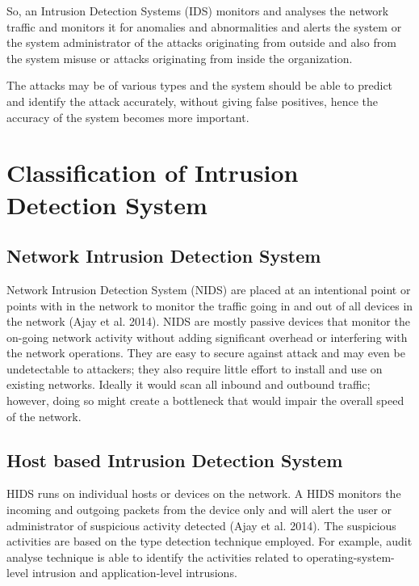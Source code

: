 \documentclass[12pt, a4paper]{report}
\begin{document}
So, an Intrusion Detection Systems (IDS) monitors and analyses the network traffic and monitors it for anomalies and abnormalities and alerts the system or the system administrator of the attacks originating from outside and also from the system misuse or attacks originating from inside the organization.\\ \par

The attacks may be of various types and the system should be able to predict and identify the attack accurately, without giving false positives, hence the accuracy of the system becomes more important. \\ \par

\section{Classification of Intrusion Detection System}
\subsection{Network Intrusion Detection System}
Network Intrusion Detection System (NIDS) are placed at an intentional point or points with in the network to monitor the traffic going in and out of all devices in the network (Ajay et al. 2014). NIDS are mostly passive devices that monitor the on-going network activity without adding significant overhead or interfering with the network operations. They are easy to secure against attack and may even be undetectable to attackers; they also require little effort to install and use on existing networks. Ideally it would scan all inbound and outbound traffic; however, doing so might create a bottleneck that would impair the overall speed of the network.

\subsection{Host based Intrusion Detection System}
HIDS runs on individual hosts or devices on the network. A HIDS monitors the incoming and outgoing packets from the device only and will alert the user or administrator of suspicious activity detected (Ajay et al. 2014). The suspicious activities are based on the type detection technique employed. For example, audit analyse  technique is able to identify the activities related to operating-system-level intrusion and application-level intrusions.
\end{document}
